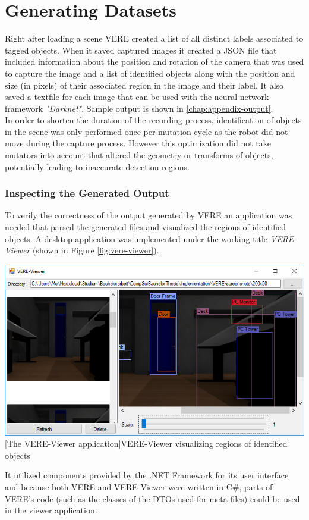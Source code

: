 \section{Generating Datasets}
Right after loading a scene \ac{VERE} created a list of all distinct labels associated to tagged objects. When it saved captured images it created a JSON file that included information about the position and rotation of the camera that was used to capture the image and a list of identified objects along with the position and size (in pixels) of their associated region in the image and their label. It also saved a textfile for each image that can be used with the neural network framework \emph{"Darknet"}. Sample output is shown in \ref{chap:appendix-output}.\\
In order to shorten the duration of the recording process, identification of objects in the scene was only performed once per mutation cycle as the robot did not move during the capture process. However this optimization did not take mutators into account that altered the geometry or transforms of objects, potentially leading to inaccurate detection regions.

\subsubsection{Inspecting the Generated Output}
To verify the correctness of the output generated by \ac{VERE} an application was needed that parsed the generated files and visualized the regions of identified objects. A desktop application was implemented under the working title \emph{VERE-Viewer} (shown in Figure \ref{fig:vere-viewer}).
\begin{center}
\noindent\includegraphics[width=14cm]{img/ch05/VERE_Viewer_Application02.png}
[The VERE-Viewer application]{VERE-Viewer visualizing regions of identified objects}
\label{fig:vere-viewer}
\end{center}
It utilized components provided by the .NET Framework for its user interface and because both \ac{VERE} and VERE-Viewer were written in C\#, parts of \ac{VERE}'s code (such as the classes of the \acp{DTO} used for meta files) could be used in the viewer application.

